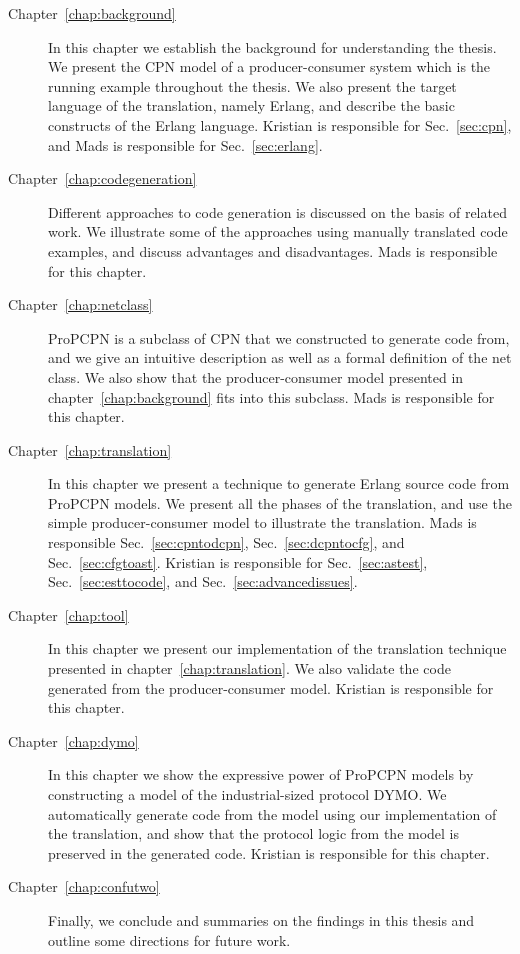 \begin{description}
\item[Chapter~\ref{chap:background}~] In this chapter we establish the background for understanding the thesis. We present the CPN model of a producer-consumer system which is the running example throughout the thesis. We also present the target language of the translation, namely Erlang, and describe the basic constructs of the Erlang language. Kristian is responsible for Sec.~\ref{sec:cpn}, and Mads is responsible for Sec.~\ref{sec:erlang}. 

\item[Chapter~\ref{chap:codegeneration}~] Different approaches to code generation is discussed on the basis of related work. We illustrate some of the approaches using manually translated code examples, and discuss advantages and disadvantages. Mads is responsible for this chapter.

\item[Chapter~\ref{chap:netclass}~] ProPCPN is a subclass of CPN that we constructed to generate code from, and we give an intuitive description as well as a formal definition of the net class. We also show that the producer-consumer model presented in chapter~\ref{chap:background} fits into this subclass. Mads is responsible for this chapter.

\item[Chapter~\ref{chap:translation}~] In this chapter we present a technique to generate Erlang source code from ProPCPN models. We present all the phases of the translation, and use the simple producer-consumer model to illustrate the translation. Mads is responsible Sec.~\ref{sec:cpntodcpn}, Sec.~\ref{sec:dcpntocfg}, and Sec.~\ref{sec:cfgtoast}. Kristian is responsible for Sec.~\ref{sec:astest}, Sec.~\ref{sec:esttocode}, and Sec.~\ref{sec:advancedissues}.

\item[Chapter~\ref{chap:tool}~] In this chapter we present our implementation of the translation technique presented in chapter~\ref{chap:translation}. We also validate the code generated from the producer-consumer model. Kristian is responsible for this chapter.

\item[Chapter~\ref{chap:dymo}~] In this chapter we show the expressive power of ProPCPN models by constructing a model of the industrial-sized protocol DYMO. We automatically generate code from the model using our implementation of the translation, and show that the protocol logic from the model is preserved in the generated code. Kristian is responsible for this chapter.

\item[Chapter~\ref{chap:confutwo}~] Finally, we conclude and summaries on the findings in this thesis and outline some directions for future work.

\end{description}

